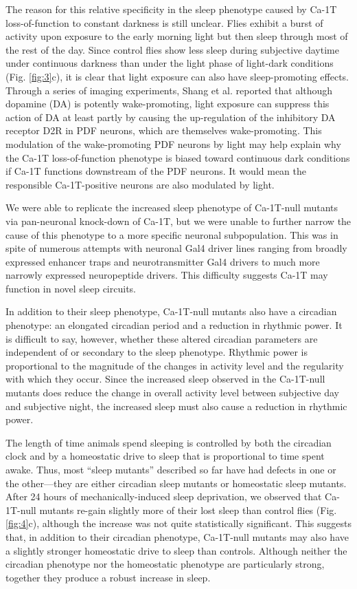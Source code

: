 The reason for this relative specificity in the sleep phenotype caused by Ca-\alpha1T loss-of-function to constant darkness is still unclear.
Flies exhibit a burst of activity upon exposure to the early morning light but then sleep through most of the rest of the day.
Since control flies show less sleep during subjective daytime under continuous darkness than under the light phase of light-dark conditions (Fig. \ref{fig:3}c), it is clear that light exposure can also have sleep-promoting effects.
Through a series of imaging experiments, Shang et al. reported that although dopamine (DA) is potently wake-promoting, light exposure can suppress this action of DA at least partly by causing the up-regulation of the inhibitory DA receptor D2R in PDF neurons, which are themselves wake-promoting\cite{shang:2011aa}.
This modulation of the wake-promoting PDF neurons by light may help explain why the Ca-\alpha1T loss-of-function phenotype is biased toward continuous dark conditions if Ca-\alpha1T functions downstream of the PDF neurons. It would mean the responsible Ca-\alpha1T-positive neurons are also modulated by light.

We were able to replicate the increased sleep phenotype of Ca-\alpha1T-null mutants via pan-neuronal knock-down of Ca-\alpha1T, but we were unable to further narrow the cause of this phenotype to a more specific neuronal subpopulation.
This was in spite of numerous attempts with neuronal Gal4 driver lines ranging from broadly expressed enhancer traps and neurotransmitter Gal4 drivers to much more narrowly expressed neuropeptide drivers.
This difficulty suggests Ca-\alpha1T may function in novel sleep circuits.

In addition to their sleep phenotype, Ca-\alpha1T-null mutants also have a circadian phenotype: an elongated circadian period and a reduction in rhythmic power.
It is difficult to say, however, whether these altered circadian parameters are independent of or secondary to the sleep phenotype.
Rhythmic power is proportional to the magnitude of the changes in activity level and the regularity with which they occur.
Since the increased sleep observed in the Ca-\alpha1T-null mutants does reduce the change in overall activity level between subjective day and subjective night, the increased sleep must also cause a reduction in rhythmic power.

The length of time animals spend sleeping is controlled by both the circadian clock and by a homeostatic drive to sleep that is proportional to time spent awake.
Thus, most ``sleep mutants'' described so far have had defects in one or the other---they are either circadian sleep mutants or homeostatic sleep mutants.
After 24 hours of mechanically-induced sleep deprivation, we observed that Ca-\alpha1T-null mutants re-gain slightly more of their lost sleep than control flies (Fig. \ref{fig:4}c), although the increase was not quite statistically significant.
This suggests that, in addition to their circadian phenotype, Ca-\alpha1T-null mutants may also have a slightly stronger homeostatic drive to sleep than controls.
Although neither the circadian phenotype nor the homeostatic phenotype are particularly strong, together they produce a robust increase in sleep.

